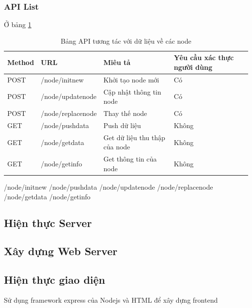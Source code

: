 \subsubsection*{API List}
Ở bảng \ref{table: apilist}

\begin{table}[H]
	\centering
	\caption{Bảng API tương tác với dữ liệu về các node}
	\begin{tabular}{|l|l|l|l|}
		\hline
		Method & URL            & Miêu tả         & Yêu cầu xác thực người dùng        \\ \hline
		POST   & /node/initnew       & Khởi tạo node mới                & Có           \\ \hline
		POST   & /node/updatenode     & Cập nhật thông tin node & Có \\ \hline
		POST   & /node/replacenode       & Thay thế node  & Có       \\ \hline
		GET   & /node/pushdata & Push dữ liệu               &         Không                \\ \hline
		GET   & /node/getdata    & Get dữ liệu thu thập của node         &  Không      \\ \hline
		GET   & /node/getinfo   & Get thông tin của node & Không  \\ \hline
	\end{tabular}
	\label{table: apilist}
\end{table}

/node/initnew
/node/pushdata
/node/updatenode
/node/replacenode
/node/getdata
/node/getinfo



\subsection{Hiện thực Server}
\subsection{Xây dựng Web Server}





\subsection{Hiện thực giao diện}

Sử dụng framework express của Nodejs và HTML để xây dựng frontend


